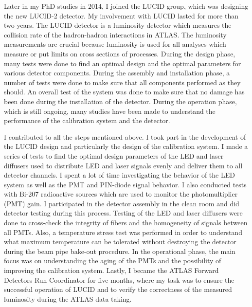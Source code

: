 \begin{preface}
Later in my PhD studies in 2014, I joined the LUCID group, which was designing the new LUCID-2 detector. My involvement with LUCID lasted for more than two years. The LUCID detector is a luminosity detector which measures the collision rate of the hadron-hadron interactions in ATLAS. The luminosity measurements are crucial because luminosity is used for all analyses which measure or put limits on cross sections of processes.
During the design phase, many tests were done to find an optimal design and the optimal parameters for various detector components.
During the assembly and installation phase, a number of tests were done to make sure that all components performed as they should.
An overall test of the system was done to make sure that no damage has been done during the installation of the detector.
During the operation phase, which is still ongoing, many studies have been made to understand the performance of the calibration system and the detector.

I contributed to all the steps mentioned above. I took part in the development of the LUCID design and particularly the design of the calibration system. 
I made a series of tests to find the optimal design parameters of the LED and laser diffusers used to distribute LED and laser signals evenly and deliver them to all 
detector channels. 
I spent a lot of time investigating the behavior of the LED system as well as the PMT and PIN-diode signal behavior.
I also conducted tests with Bi-207 radioactive sources which are used to monitor the photomultiplier (PMT) gain.
I participated in the detector assembly in the clean room and did detector testing during this process.
Testing of the LED and laser diffusers were done to cross-check the integrity of fibers and the homogeneity of signals between all PMTs.
Also, a temperature stress test was performed in order to understand what maximum temperature can be tolerated without destroying the detector during the 
beam pipe bake-out procedure.
In the operational phase, the main focus was on understanding the aging of the PMTs and the possibility of improving the calibration system.
Lastly, I became the ATLAS Forward Detectors Run Coordinator for five months, where my task was to ensure the successful operation of LUCID and to verify the correctness of the measured luminosity during the ATLAS data taking.



\end{preface}
